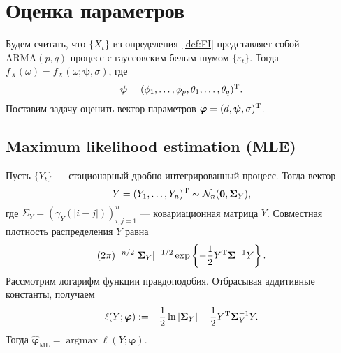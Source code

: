 \documentclass[specialist,
substylefile = spbu_report.rtx,
subf,href,colorlinks=true, 12pt]{disser}
\theoremstyle{definition}
\begin{document}
\section{Оценка параметров}
Будем считать, что $\{X_t\}$ из определения~\ref{def:FI}  представляет собой $\mathrm{ARMA}(p, q)$ процесс с гауссовским белым шумом $\{\varepsilon_t\}$.  Тогда $f_X(\omega)=f_X(\omega; \bm\psi, \sigma)$, где
$$\bm\psi=(\phi_1,\ldots,\phi_p,\theta_1,\ldots,\theta_q)^{\mathrm{T}}.$$ Поставим задачу оценить вектор параметров $\bm\varphi=(d, \bm\psi, \sigma)^{\mathrm{T}}$.

\subsection{Maximum likelihood estimation (MLE)}
Пусть $\{Y_t\}$ --- стационарный дробно интегрированный процесс. Тогда вектор
\[
	Y=(Y_1,\ldots,Y_n)^{\mathrm{T}}\sim \mathcal{N}_n(\bm0, \bm\Sigma_Y),
\]
где $\Sigma_Y=(\gamma_Y(|i-j|))_{i,j=1}^n$ --- ковариационная матрица $Y$. Совместная плотность распределения $Y$ равна
\[
	(2\pi)^{-n/2}|\bm\Sigma_Y|^{-1/2}\exp\left\{-\frac12Y^{\mathrm{T}}\bm\Sigma^{-1}Y\right\}.
\]
Рассмотрим логарифм функции правдоподобия. Отбрасывая аддитивные константы, получаем
\[
	\ell(Y;\bm\varphi):=-\frac12\ln|\bm\Sigma_Y|-\frac12 Y^{\mathrm{T}} \bm\Sigma^{-1}_Y Y.
\]
Тогда $\widehat{\bm\varphi}_\mathrm{ML}=\operatorname{argmax}\ell(Y;\bm\varphi).$
\end{document}
